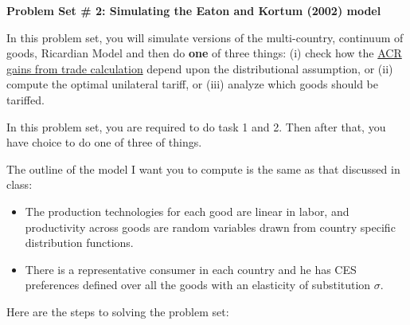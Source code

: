\documentclass[pdftex,11pt]{article}
\begin{document}
\centerline{ \large \textbf{Problem Set \# 2: Simulating the Eaton and Kortum (2002) model}}

\bigskip

In this problem set, you will simulate versions of the multi-country, continuum of goods, Ricardian Model and then do \textbf{one} of three things: (i) check how the \href{https://www.aeaweb.org/articles?id=10.1257/aer.102.1.94}{ACR gains from trade calculation} depend upon the distributional assumption, or (ii) compute the optimal unilateral tariff, or (iii) analyze which goods should be tariffed.

In this problem set, you are required to do task 1 and 2. Then after that, you have choice to do one of three of things.

The outline of the model I want you to compute is the same as that discussed in class:
\begin{itemize}
\item The production technologies for each good are linear in labor, and productivity across goods are random variables drawn from country specific distribution functions.

\item There is a representative consumer in each country and he has CES preferences defined over all the goods with an elasticity of substitution $\sigma$.
\end{itemize}
Here are the steps to solving the problem set:
\end{document}
